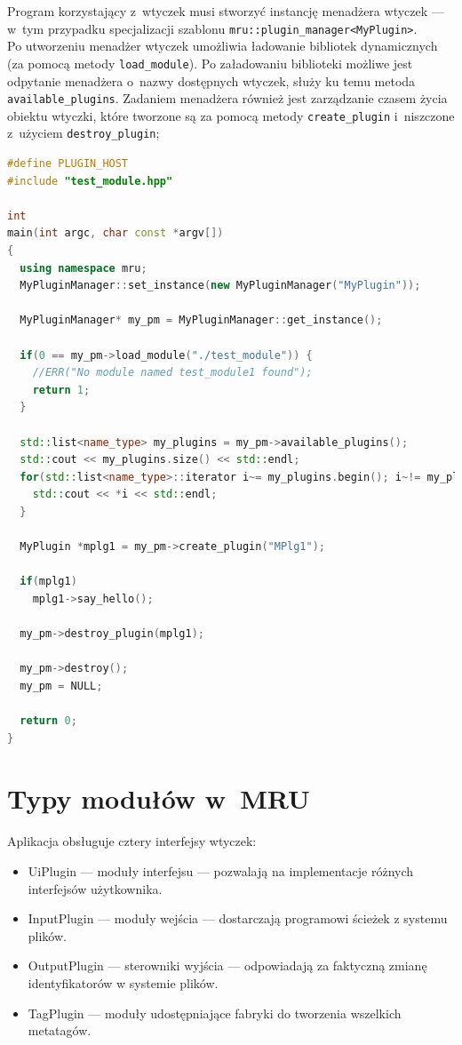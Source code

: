 \par
Program korzystający z~wtyczek musi stworzyć instancję menadżera wtyczek --- w~tym przypadku specjalizacji szablonu \texttt{mru::plugin\_manager<MyPlugin>}.\\
Po utworzeniu menadżer wtyczek umożliwia ładowanie bibliotek dynamicznych (za pomocą metody \texttt{load\_module}). Po załadowaniu biblioteki możliwe jest odpytanie menadżera o~nazwy dostępnych wtyczek, służy ku temu metoda \texttt{available\_plugins}.
Zadaniem menadżera również jest zarządzanie czasem życia obiektu wtyczki, które tworzone są za pomocą metody \texttt{create\_plugin} i~niszczone z~użyciem \texttt{destroy\_plugin};
\begin{lstlisting}[caption={ main.cpp}, language=C++]
#define PLUGIN_HOST
#include "test_module.hpp"

int
main(int argc, char const *argv[])
{
  using namespace mru;
  MyPluginManager::set_instance(new MyPluginManager("MyPlugin"));

  MyPluginManager* my_pm = MyPluginManager::get_instance();

  if(0 == my_pm->load_module("./test_module")) {
    //ERR("No module named test_module1 found");
    return 1;
  }

  std::list<name_type> my_plugins = my_pm->available_plugins();
  std::cout << my_plugins.size() << std::endl;
  for(std::list<name_type>::iterator i~= my_plugins.begin(); i~!= my_plugins.end(); ++i) {
    std::cout << *i << std::endl;
  }

  MyPlugin *mplg1 = my_pm->create_plugin("MPlg1");

  if(mplg1)
    mplg1->say_hello();

  my_pm->destroy_plugin(mplg1); 
  
  my_pm->destroy();
  my_pm = NULL;
  
  return 0;
}
\end{lstlisting}

\section{Typy modułów w~MRU}
\label{moduly}
Aplikacja obsługuje cztery interfejsy wtyczek:
\begin{itemize}
\item UiPlugin --- moduły interfejsu --- pozwalają na implementacje różnych interfejsów użytkownika.
\item InputPlugin --- moduły wejścia --- dostarczają programowi ścieżek z systemu plików.
\item OutputPlugin --- sterowniki wyjścia --- odpowiadają za faktyczną zmianę identyfikatorów w systemie plików.
\item TagPlugin --- moduły udostępniające fabryki do tworzenia wszelkich metatagów.
\end{itemize}

